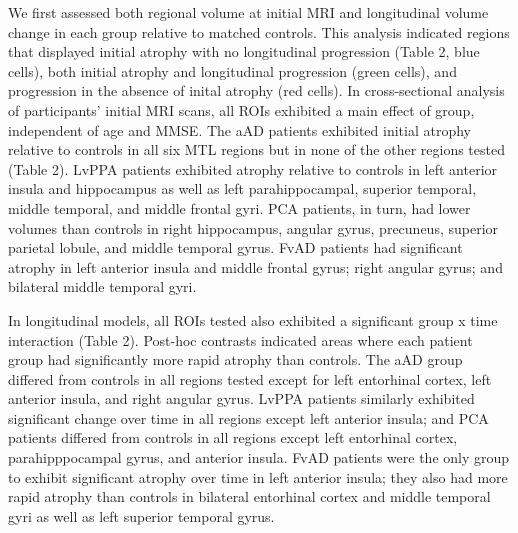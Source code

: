 \documentclass[]{article}
\begin{document}
We first assessed both regional volume at initial MRI and longitudinal
volume change in each group relative to matched controls. This analysis
indicated regions that displayed initial atrophy with no longitudinal
progression (Table 2, blue cells), both initial atrophy and longitudinal
progression (green cells), and progression in the absence of inital
atrophy (red cells). In cross-sectional analysis of participants'
initial MRI scans, all ROIs exhibited a main effect of group,
independent of age and MMSE. The aAD patients exhibited initial atrophy
relative to controls in all six MTL regions but in none of the other
regions tested (Table 2). LvPPA patients exhibited atrophy relative to
controls in left anterior insula and hippocampus as well as left
parahippocampal, superior temporal, middle temporal, and middle frontal
gyri. PCA patients, in turn, had lower volumes than controls in right
hippocampus, angular gyrus, precuneus, superior parietal lobule, and
middle temporal gyrus. FvAD patients had significant atrophy in left
anterior insula and middle frontal gyrus; right angular gyrus; and
bilateral middle temporal gyri.

In longitudinal models, all ROIs tested also exhibited a significant
group x time interaction (Table 2). Post-hoc contrasts indicated areas
where each patient group had significantly more rapid atrophy than
controls. The aAD group differed from controls in all regions tested
except for left entorhinal cortex, left anterior insula, and right
angular gyrus. LvPPA patients similarly exhibited significant change
over time in all regions except left anterior insula; and PCA patients
differed from controls in all regions except left entorhinal cortex,
parahipppocampal gyrus, and anterior insula. FvAD patients were the only
group to exhibit significant atrophy over time in left anterior insula;
they also had more rapid atrophy than controls in bilateral entorhinal
cortex and middle temporal gyri as well as left superior temporal gyrus.
\end{document}
